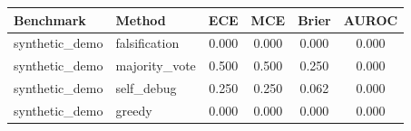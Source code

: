 \begin{tabular}{llcccc}
\toprule
Benchmark & Method & ECE & MCE & Brier & AUROC \\
\midrule
synthetic_demo & falsification & 0.000 & 0.000 & 0.000 & 0.000 \\
synthetic_demo & majority_vote & 0.500 & 0.500 & 0.250 & 0.000 \\
synthetic_demo & self_debug & 0.250 & 0.250 & 0.062 & 0.000 \\
synthetic_demo & greedy & 0.000 & 0.000 & 0.000 & 0.000 \\
\bottomrule
\end{tabular}

